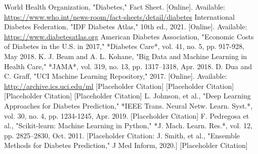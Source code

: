 \documentclass[conference]{IEEEtran}
\begin{document}
\begin{thebibliography}{99} %
 World Health Organization, "Diabetes," Fact Sheet. [Online]. Available: \url{https://www.who.int/news-room/fact-sheets/detail/diabetes}
 International Diabetes Federation, "IDF Diabetes Atlas," 10th ed., 2021. [Online]. Available: \url{https://www.diabetesatlas.org}
 American Diabetes Association, "Economic Costs of Diabetes in the U.S. in 2017," *Diabetes Care*, vol. 41, no. 5, pp. 917-928, May 2018.
 K. J. Beam and A. L. Kohane, "Big Data and Machine Learning in Health Care," *JAMA*, vol. 319, no. 13, pp. 1317–1318, Apr. 2018.
 D. Dua and C. Graff, "UCI Machine Learning Repository," 2017. [Online]. Available: \url{http://archive.ics.uci.edu/ml}
 [Placeholder Citation]
 [Placeholder Citation]
 [Placeholder Citation]
 [Placeholder Citation]
 L. Johnson, et al., "Deep Learning Approaches for Diabetes Prediction," *IEEE Trans. Neural Netw. Learn. Syst.*, vol. 30, no. 4, pp. 1234-1245, Apr. 2019.
 [Placeholder Citation]
 F. Pedregosa et al., "Scikit-learn: Machine Learning in Python," *J. Mach. Learn. Res.*, vol. 12, pp. 2825–2830, Oct. 2011.
 [Placeholder Citation: J. Smith, et al., "Ensemble Methods for Diabetes Prediction," J Med Inform, 2020.]
 [Placeholder Citation]

\end{thebibliography}
\end{document}
